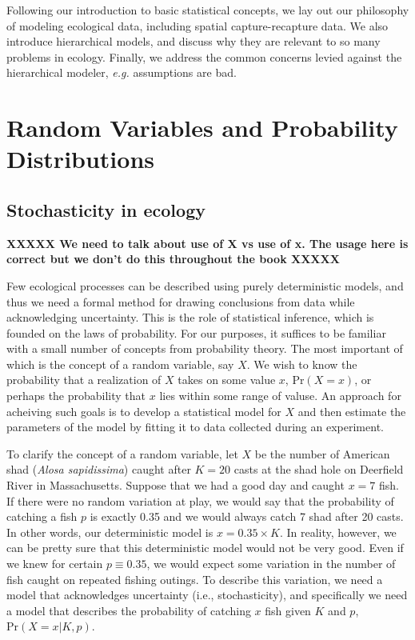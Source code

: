 Following our introduction to basic statistical concepts, we lay out our
philosophy of modeling ecological data, including spatial
capture-recapture data. We also introduce hierarchical
models, and discuss why they are relevant to so many problems in
ecology. Finally, we address the common concerns levied against the
hierarchical modeler, \emph{e.g.} assumptions are bad.

\section{Random Variables and Probability Distributions}

\subsection{Stochasticity in ecology}

{\bf XXXXX We need to talk about use of X vs use of x. The usage here
  is correct but we don't do this throughout the book XXXXX}

Few ecological processes can be described using purely deterministic
models, and thus we need a formal method for drawing conclusions from data while
acknowledging uncertainty. This is the role of statistical inference,
which is founded on the laws of probability. For our purposes, it
suffices to be familiar with a small number of concepts from
probability theory. The most important of which is the concept of a random
variable, say $X$. We wish to know the probability that a realization
of $X$ takes on some value $x$, %
$\text{Pr}(X=x)$, or perhaps the probability that $x$ lies within some
range of valuse. An approach for acheiving such goals is to develop a
statistical model for $X$ and then estimate the parameters of the
model by fitting it to data collected during an experiment.

To clarify the concept of a random variable, let $X$ be the number of
American shad (\emph{Alosa sapidissima}) caught after $K=20$ casts at
the shad hole on Deerfield River in Massachusetts. Suppose that
we had a good day and caught $x=7$ fish. If there were no random
variation at play, we would say that the probability of catching a
fish $p$ is exactly 0.35 and we would always catch 7 shad after 20
casts. In other words, our deterministic model is $x =
0.35\times K$. In reality, however, we can be pretty sure that this
deterministic model would not be very good. Even if we knew for
certain $p \equiv 0.35$, we would expect some variation in the number
of fish caught on repeated fishing outings. To describe this
variation, we need a model that acknowledges uncertainty (i.e.,
stochasticity), and specifically we need a model that describes the
probability of catching $x$ fish given $K$ and $p$,
$\text{Pr}(X=x|K,p)$.

